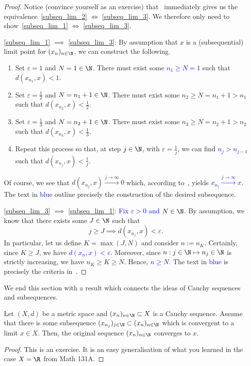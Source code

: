 \begin{proof}
Notice (convince yourself as an exercise) that~ immediately gives us the equivalence~\ref{subseq_lim_2} $\iff$ \ref{subseq_lim_3}. We therefore only need to show~\ref{subseq_lim_1} $\iff$ \ref{subseq_lim_3}.

\ref{subseq_lim_1} $\implies$ \ref{subseq_lim_3}: By assumption that $x$ is a (subsequential) limit point for $(x_n)_{n\in\N}$, we can construct the following.
\begin{enumerate}
	\item Set $\varepsilon = 1$ and $N = 1\in \N$. There must exist some \textcolor{blue}{$n_1 \ge N = 1$} such that $d(x_{n_1},x)<1$.
	\item Set $\varepsilon = \frac{1}{2}$ and $N = n_1 + 1 \in \N$. There must exist some $n_2 \ge N = n_1+1 > n_1$ such that $d(x_{n_2},x)<\frac{1}{2}$.
	\item Set $\varepsilon = \frac{1}{3}$ and $N = n_2 + 1\in\N$. There must exist some $n_3 \ge N = n_2 + 1 > n_2$ such that $d(x_{n_3},x)<\frac{1}{3}$.
	\item Repeat this process so that, at step $j\in\N$, with $\varepsilon = \frac{1}{j}$, we can find \textcolor{blue}{$n_j > n_{j-1}$} such that $d(x_{n_j},x)<\frac{1}{j}$.
\end{enumerate}
Of course, we see that $d(x_{n_j},x)\overset{j\to \infty}{\to} 0$ which, according to~, yields \textcolor{blue}{$x_{n_j}\overset{j\to \infty}{\to} x$.} The text in \textcolor{blue}{blue} outline precisely the construction of the desired subsequence.

\ref{subseq_lim_3} $\implies$ \ref{subseq_lim_1}: \textcolor{blue}{Fix $\varepsilon>0$ and $N\in\N$.} By assumption, we know that there exists some $J\in\N$ such that
\[
j\ge J \implies d(x_{n_j},x)<\varepsilon.
\]
In particular, let us define $K = \max(J,N)$ and consider $n:=n_K$. Certainly, since $K \ge J$, we have \textcolor{blue}{$d(x_n,x)<\varepsilon$.} Moreover, since $n:j\in \N \mapsto n_j\in\N$ is strictly increasing, we have $n_K \ge K \ge N$. Hence, \textcolor{blue}{$n\ge N$.} The text in \textcolor{blue}{blue} is precisely the criteria in~.
\end{proof}
We end this section with a result which connects the ideas of Cauchy sequences and subsequences.
\begin{lemma}
\label{lem:cauchy_sub_cvg}
Let $(X,d)$ be a metric space and $(x_n)_{n\in\N}\subset X$ is a Cauchy sequence. Assume that there is some subsequence $(x_{n_j})_{j\in\N}\subset (x_n)_{n\in\N}$ which is convergent to a limit $x\in X$. Then, the original sequence $(x_n)_{n\in\N}$ converges to $x$.
\end{lemma}
\begin{proof}
This is an exercise. It is an easy generalisation of what you learned in the case $X = \R$ from Math 131A.
\end{proof}